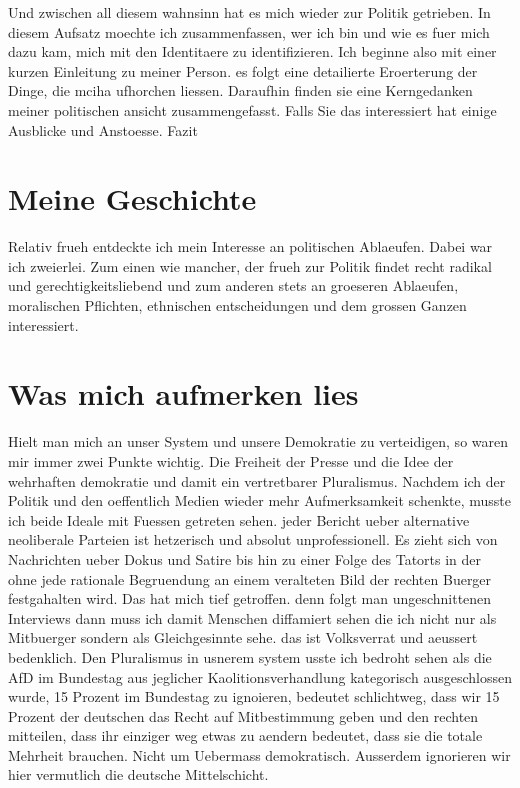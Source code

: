 \documentclass{turabian-researchpaper}
\begin{document}
Und zwischen all diesem wahnsinn hat es mich wieder zur Politik getrieben. In diesem Aufsatz moechte ich zusammenfassen, wer ich bin und wie es fuer mich dazu kam, mich mit den Identitaere zu identifizieren. Ich beginne also mit einer kurzen Einleitung zu meiner Person. 
es folgt eine detailierte Eroerterung der Dinge, die mciha ufhorchen liessen.
Daraufhin finden sie eine Kerngedanken meiner politischen ansicht zusammengefasst.
Falls Sie das interessiert hat einige Ausblicke und Anstoesse.
Fazit


\section{Meine Geschichte}

Relativ frueh entdeckte ich mein Interesse an politischen Ablaeufen. Dabei war ich zweierlei. Zum einen wie mancher, der frueh zur Politik findet recht radikal und gerechtigkeitsliebend und zum anderen stets an groeseren Ablaeufen, moralischen Pflichten, ethnischen entscheidungen und dem grossen Ganzen interessiert.


\section{Was mich aufmerken lies}

Hielt man mich an unser System und unsere Demokratie zu verteidigen, so waren mir immer zwei Punkte wichtig. Die Freiheit der Presse und die Idee der wehrhaften demokratie und damit ein vertretbarer Pluralismus.
Nachdem ich der Politik und den oeffentlich Medien wieder mehr Aufmerksamkeit schenkte, musste ich beide Ideale mit Fuessen getreten sehen.
jeder Bericht ueber alternative neoliberale Parteien ist hetzerisch und absolut unprofessionell. Es zieht sich von Nachrichten ueber Dokus und Satire bis hin zu einer Folge des Tatorts in der ohne jede rationale Begruendung an einem veralteten Bild der rechten Buerger festgahalten wird.
Das hat mich tief getroffen. denn folgt man ungeschnittenen Interviews dann muss ich damit Menschen diffamiert sehen die ich nicht nur als Mitbuerger sondern als Gleichgesinnte sehe. das ist Volksverrat und aeussert bedenklich.
Den Pluralismus in usnerem system usste ich bedroht sehen als die AfD im Bundestag aus jeglicher Kaolitionsverhandlung kategorisch ausgeschlossen wurde,
15 Prozent im Bundestag zu ignoieren, bedeutet schlichtweg, dass wir 15 Prozent der deutschen das Recht auf Mitbestimmung geben und den rechten mitteilen, dass ihr einziger weg etwas zu aendern bedeutet, dass sie die totale Mehrheit brauchen. Nicht um Uebermass demokratisch. Ausserdem ignorieren wir hier vermutlich die deutsche Mittelschicht.
\end{document}
